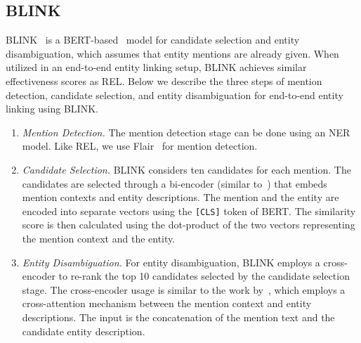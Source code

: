 \subsection{BLINK}
BLINK~\citep{blink} is a BERT-based~\citep{BERT} model for candidate selection and entity disambiguation, which assumes that entity mentions are already given. When utilized in an end-to-end entity linking setup, BLINK achieves similar effectiveness scores as REL. Below we describe the three steps of mention detection, candidate selection, and entity disambiguation for end-to-end entity linking using BLINK.

\begin{enumerate}
    \item \emph{Mention Detection.} The mention detection stage can be done using an NER model. Like REL, we use Flair~\citep{flair} for mention detection.
	\item \emph{Candidate Selection.} BLINK considers ten candidates for each mention. The candidates are selected through a bi-encoder (similar to~\citet{poly-encoders}) that embeds mention contexts and entity descriptions. The mention and the entity are encoded into separate vectors using the \texttt{[CLS]} token of BERT. The similarity score is then calculated using the dot-product of the two vectors representing the mention context and the entity.  
	\item \emph{Entity Disambiguation.} For entity disambiguation, BLINK employs a cross-encoder to re-rank the top 10 candidates selected by the candidate selection stage. The cross-encoder usage is similar to the work by~\citet{poly-encoders}, which employs a cross-attention mechanism between the mention context and entity descriptions. The input is the concatenation of the mention text and the candidate entity description.    
\end{enumerate}

